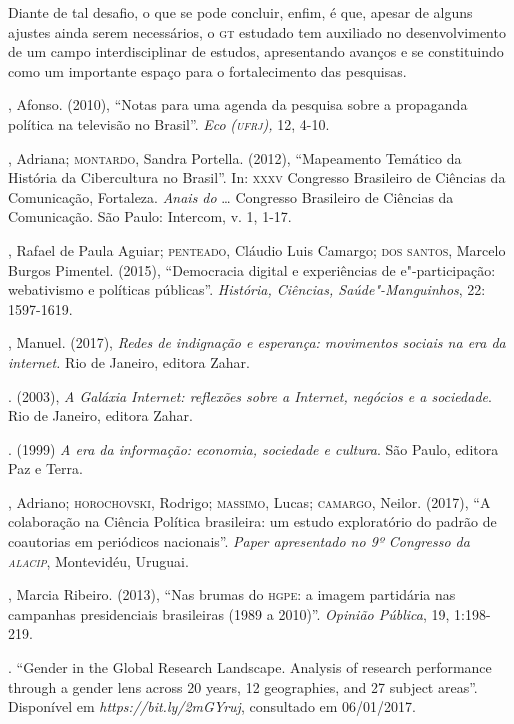 Diante de tal desafio, o que se pode concluir, enfim, é que, apesar de
alguns ajustes ainda serem necessários, o \textsc{gt} estudado tem auxiliado no
desenvolvimento de um campo interdisciplinar de estudos, apresentando
avanços e se constituindo como um importante espaço para o
fortalecimento das pesquisas.

\begin{bibliohedra}
, Afonso. (2010), ``Notas para uma agenda da pesquisa sobre a
propaganda política na televisão no Brasil''. \emph{Eco} \emph{(\textsc{ufrj}),}
12, 4-10.

, Adriana; \textsc{montardo}, Sandra Portella. (2012), ``Mapeamento
Temático da História da Cibercultura no Brasil''. In: \textsc{xxxv} Congresso
Brasileiro de Ciências da Comunicação, Fortaleza. \emph{Anais do} \ldots{}
Congresso Brasileiro de Ciências da Comunicação. São Paulo: Intercom, v.
1, 1-17.

, Rafael de Paula Aguiar; \textsc{penteado}, Cláudio Luis Camargo; \textsc{dos
santos}, Marcelo Burgos Pimentel. (2015), ``Democracia digital e
experiências de e"-participação: webativismo e políticas públicas''.
\emph{História, Ciências, Saúde"-Manguinhos}, 22: 1597-1619.

, Manuel. (2017), \emph{Redes de indignação e esperança:
movimentos sociais na era da internet.} Rio de Janeiro, editora Zahar.

\titidem. (2003), \emph{A Galáxia Internet: reflexões sobre a
Internet, negócios e a sociedade}. Rio de Janeiro, editora Zahar.

\titidem. (1999) \emph{A era da informação: economia, sociedade
e cultura}. São Paulo, editora Paz e Terra.

, Adriano; \textsc{horochovski}, Rodrigo; \textsc{massimo}, Lucas; \textsc{camargo}, Neilor.
(2017), ``A colaboração na Ciência Política brasileira: um estudo
exploratório do padrão de coautorias em periódicos nacionais''.
\emph{Paper apresentado no 9º Congresso da \textsc{alacip}}, Montevidéu,
Uruguai.

, Marcia Ribeiro. (2013), ``Nas brumas do \textsc{hgpe}: a imagem partidária
nas campanhas presidenciais brasileiras (1989 a 2010)''. \emph{Opinião
Pública}, 19, 1:198-219.

. ``Gender in the Global Research Landscape. Analysis of
research performance through a gender lens across 20 years, 12
geographies, and 27 subject areas''. Disponível em
\emph{https://bit.ly/2mGYruj}, consultado em 06/01/2017.


\end{bibliohedra}
